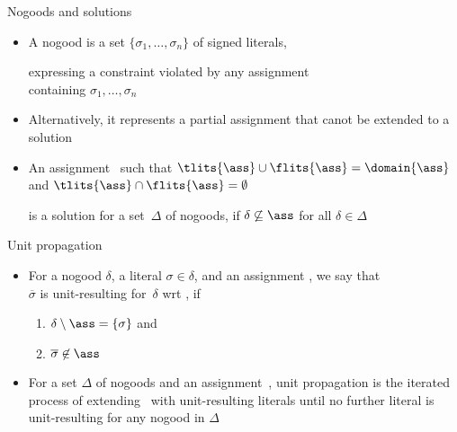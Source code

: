 \begin{frame}{Nogoods and solutions}
  \begin{itemize}
  \item A \alert{nogood} is a set $\{\sigma_1,\ldots,\sigma_n\}$ of
    signed literals,

    expressing a \alert{constraint} violated by any assignment
    \\
    containing $\sigma_1,\ldots,\sigma_n$
  \item Alternatively, it represents a partial assignment
    that canot be extended to a solution
  \item<2-> An assignment \ass\ such that
    \(
    \tlits{\ass} \cup \flits{\ass}
    =
    \domain{\ass}
    \)
    and
    \(
    \tlits{\ass} \cap \flits{\ass}
    =
    \emptyset
    \)

    is a \alert{solution} for a set~$\Delta$ of nogoods,
    if
    $\delta\not\subseteq\ass$ for all $\delta\in\Delta$
  \end{itemize}
\end{frame}
\begin{frame}{Unit propagation}
  \begin{itemize}
  \item<3-> For a nogood $\delta$, a literal $\sigma\in\delta$, and an assignment \ass,
    we say that\\
    \alert{$\overline{\sigma}$} is \alert{unit-resulting} for~$\delta$ wrt \ass,
    if
    \begin{enumerate}
    \item $\delta\setminus\ass=\{\sigma\}$
      and
    \item $\overline{\sigma}\not\in\ass$
    \end{enumerate}
  \item<4-> For a set $\Delta$ of nogoods and an assignment~\ass,
    \alert{unit propagation} is the iterated process of extending \ass\ with
    unit-resulting literals until no further literal is unit-resulting for any
    nogood in $\Delta$
  \end{itemize}
\end{frame}
%

